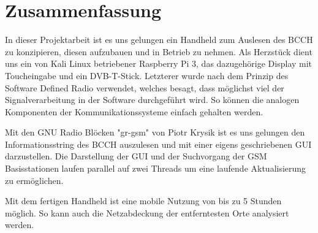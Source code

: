 %
%
\chapter{Zusammenfassung}

In dieser Projektarbeit ist es uns gelungen ein Handheld zum Auslesen des BCCH zu konzipieren, diesen aufzubauen und in Betrieb zu nehmen. Als Herzstück dient uns ein von Kali Linux betriebener Raspberry Pi 3, das dazugehörige Display mit Toucheingabe und ein DVB-T-Stick. Letzterer wurde nach dem Prinzip des Software Defined Radio verwendet, welches besagt, dass möglichst viel der Signalverarbeitung in der Software durchgeführt wird. So können die analogen Komponenten der Kommunikationssysteme einfach gehalten werden.

Mit den GNU Radio Blöcken "gr-gsm" von Piotr Krysik ist es uns gelungen den Informationsstring des BCCH auszulesen und mit einer eigens geschriebenen \ac{GUI} darzustellen. Die Darstellung der \ac{GUI} und der Suchvorgang der \ac{GSM} Basisstationen laufen parallel auf zwei Threads um eine laufende Aktualisierung zu ermöglichen.

Mit dem fertigen Handheld ist eine mobile Nutzung von bis zu 5 Stunden möglich. So kann auch die Netzabdeckung der entferntesten Orte analysiert werden.